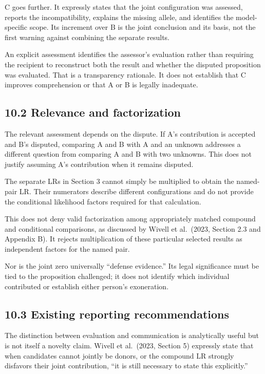 \documentclass[
]{article}
\begin{document}
C goes further. It expressly states that the joint configuration was
assessed, reports the incompatibility, explains the missing allele, and
identifies the model-specific scope. Its increment over B is the joint
conclusion and its basis, not the first warning against combining the
separate results.

An explicit assessment identifies the assessor's evaluation rather than
requiring the recipient to reconstruct both the result and whether the
disputed proposition was evaluated. That is a transparency rationale. It
does not establish that C improves comprehension or that A or B is
legally inadequate.

\subsection{10.2 Relevance and
factorization}\label{relevance-and-factorization}

The relevant assessment depends on the dispute. If A's contribution is
accepted and B's disputed, comparing A and B with A and an unknown
addresses a different question from comparing A and B with two unknowns.
This does not justify assuming A's contribution when it remains
disputed.

The separate LRs in Section 3 cannot simply be multiplied to obtain the
named-pair LR. Their numerators describe different configurations and do
not provide the conditional likelihood factors required for that
calculation.

This does not deny valid factorization among appropriately matched
compound and conditional comparisons, as discussed by Wivell et
al.~(2023, Section 2.3 and Appendix B). It rejects multiplication of
these particular selected results as independent factors for the named
pair.

Nor is the joint zero universally ``defense evidence.'' Its legal
significance must be tied to the proposition challenged; it does not
identify which individual contributed or establish either person's
exoneration.

\subsection{10.3 Existing reporting
recommendations}\label{existing-reporting-recommendations}

The distinction between evaluation and communication is analytically
useful but is not itself a novelty claim. Wivell et al.~(2023, Section
5) expressly state that when candidates cannot jointly be donors, or the
compound LR strongly disfavors their joint contribution, ``it is still
necessary to state this explicitly.''
\end{document}
